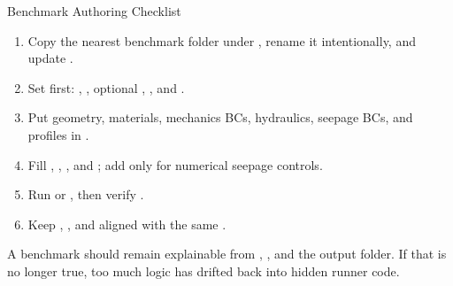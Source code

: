 \documentclass[aspectratio=169,10pt]{beamer}
\begin{document}
\begin{frame}{Benchmark Authoring Checklist}
\small
\begin{enumerate}
  \item Copy the nearest benchmark folder under , rename it intentionally, and update \code{[benchmark]}.
  \item Set \code{[problem]} first: , , optional , , and .
  \item Put geometry, materials, mechanics BCs, hydraulics, seepage BCs, and profiles in .
  \item Fill \code{[execution]}, \code{[continuation]}, \code{[newton]}, and ; add \code{[seepage]} only for numerical seepage controls.
  \item Run  or , then verify .
  \item Keep , , and  aligned with the same .
\end{enumerate}
\vspace{0.14cm}
\begin{callout}
A benchmark should remain explainable from , , and the output folder. If that is no longer true, too much logic has drifted back into hidden runner code.
\end{callout}
\end{frame}

\end{document}
